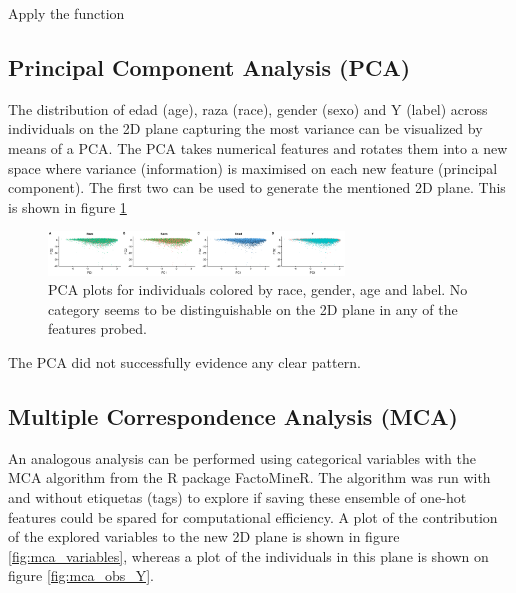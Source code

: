 \documentclass{article}\usepackage[]{graphicx}\usepackage[]{color}
\begin{document}
   
Apply the function



  



  
  
\subsection{\textbf{P}rincipal \textbf{C}omponent \textbf{A}nalysis (PCA)}

The distribution of edad (age), raza (race), gender (sexo) and Y (label) across individuals on the 2D plane
capturing the most variance can be visualized by means of a PCA. The PCA takes numerical features and rotates them into a new space where variance (information) is maximised on each new feature (principal component). The first two can be used to generate the mentioned 2D plane. This is shown in figure \ref{fig:pca_multicategory}



\begin{figure}[!h]
\centering
\includegraphics[width=0.7\textwidth]{plots/PCA_multicategory}
\caption{PCA plots for individuals colored by race, gender, age and label. No category seems to be distinguishable on the 2D plane in any of the features probed.}
\label{fig:pca_multicategory}
\end{figure}

The PCA did not successfully evidence any clear pattern.

\subsection{\textbf{M}ultiple \textbf{C}orrespondence \textbf{A}nalysis (MCA)}

An analogous analysis can be performed using categorical variables with the MCA algorithm from the R package FactoMineR. The algorithm was run with and without etiquetas (tags) to explore if saving these ensemble of one-hot features could be spared for computational efficiency. A plot of the contribution of the explored variables to the new 2D plane is shown in figure \ref{fig:mca_variables}, whereas a plot of the individuals in this plane is shown on figure \ref{fig:mca_obs_Y}.
\end{document}
